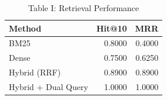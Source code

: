 \begin{table}
\caption{Table I: Retrieval Performance}
\label{tab:retrieval_performance}
\begin{tabular}{lrr}
\toprule
Method & Hit@10 & MRR \\
\midrule
BM25 & 0.8000 & 0.4000 \\
Dense & 0.7500 & 0.6250 \\
Hybrid (RRF) & 0.8900 & 0.8900 \\
Hybrid + Dual Query & 1.0000 & 1.0000 \\
\bottomrule
\end{tabular}
\end{table}
